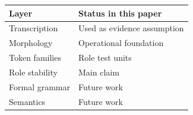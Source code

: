 {\small
\begin{tabular}{ll}
\toprule
Layer & Status in this paper \\
\midrule
Transcription & Used as evidence assumption \\
Morphology & Operational foundation \\
Token families & Role test units \\
Role stability & Main claim \\
Formal grammar & Future work \\
Semantics & Future work \\
\bottomrule
\end{tabular}
}

